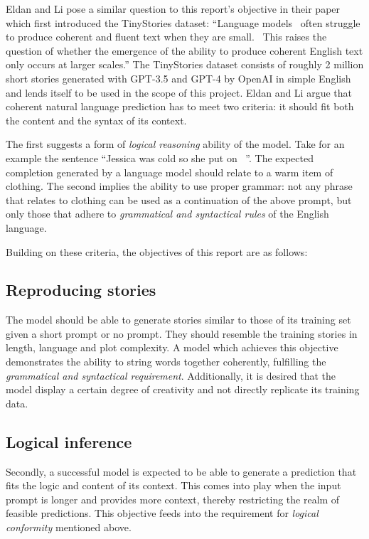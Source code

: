 \documentclass[11pt]{article}
\begin{document}
    Eldan and Li pose a similar question to this report's objective in their paper which first introduced the TinyStories dataset: “Language models \textellipsis\ often struggle to produce coherent and fluent text when they are small. \textellipsis\ This raises the question of whether the emergence of the ability to produce coherent English text only occurs at larger scales.” \cite{tinystories}
    The TinyStories dataset consists of roughly 2 million short stories generated with GPT-3.5 and GPT-4 by OpenAI in simple English and lends itself to be used in the scope of this project. Eldan and Li argue that coherent natural language prediction has to meet two criteria: it should fit both the content and the syntax of its context.

    The first suggests a form of \textit{logical reasoning} ability of the model. Take for an example the sentence “Jessica was cold so she put on \textellipsis\ ”.
    The expected completion generated by a language model should relate to a warm item of clothing. The second implies the ability to use proper grammar: not any phrase that relates to clothing can be used as a continuation of the above prompt, but only those that adhere to \textit{grammatical and syntactical rules} of the English language.

    Building on these criteria, the objectives of this report are as follows:

    \subsection*{Reproducing stories}
    The model should be able to generate stories similar to those of its training set given a short prompt or no prompt.
    They should resemble the training stories in length, language and plot complexity.
    A model which achieves this objective demonstrates the ability to string words together coherently, fulfilling the \textit{grammatical and syntactical requirement}.
    Additionally, it is desired that the model display a certain degree of creativity and not directly replicate its training data.

    \subsection*{Logical inference}
    Secondly, a successful model is expected to be able to generate a prediction that fits the logic and content of its context. This comes into play when the input prompt is longer and provides more context, thereby restricting the realm of feasible predictions.
    This objective feeds into the requirement for \textit{logical conformity} mentioned above.
\end{document}
